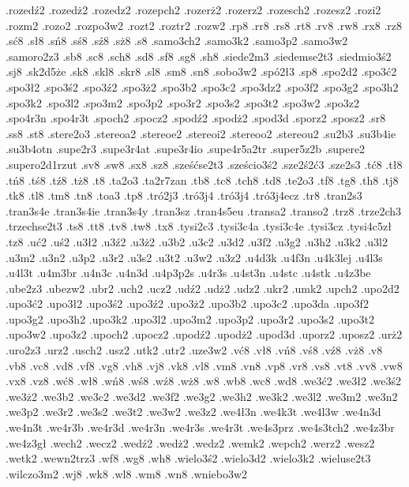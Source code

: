 {.rozed\'z2
.rozed\.z2
.rozedz2
.rozepch2
.rozer\.z2
.rozerz2
.rozesch2
.rozesz2
.rozi2
.rozm2
.rozo2
.rozpo3w2
.rozt2
.roztr2
.rozw2
.rp8
.rr8
.rs8
.rt8
.rv8
.rw8
.rx8
.rz8
.s\'c8
.s\l 8
.s\'n8
.s\'s8
.s\'z8
.s\.z8
.s8
.samo3ch2
.samo3k2
.samo3p2
.samo3w2
.samoro2z3
.sb8
.sc8
.sch8
.sd8
.sf8
.sg8
.sh8
.siede2m3
.siedemse2t3
.siedmio3\'s2
.sj8
.sk\ka2d5\.ze
.sk8
.skl8
.skr8
.sl8
.sm8
.sn8
.sobo3w2
.sp\'o2\l 3
.sp8
.spo2d2
.spo3\'c2
.spo3\l 2
.spo3\'s2
.spo3\'z2
.spo3\.z2
.spo3b2
.spo3c2
.spo3dz2
.spo3f2
.spo3g2
.spo3h2
.spo3k2
.spo3l2
.spo3m2
.spo3p2
.spo3r2
.spo3s2
.spo3t2
.spo3w2
.spo3z2
.spo4r3n
.spo4r3t
.spoch2
.spocz2
.spod\'z2
.spod\.z2
.spod3d
.sporz2
.sposz2
.sr8
.ss8
.st8
.stere2o3
.stereoa2
.stereoe2
.stereoi2
.stereoo2
.stereou2
.su2b3
.su3b4ie
.su3b4otn
.supe2r3
.supe3r4at
.supe3r4io
.supe4r5a2tr
.super5z2b
.supere2
.supero2d1rzut
.sv8
.sw8
.sx8
.sz8
.sze\'s\'cse2t3
.sze\'scio3\'s2
.sze2\'s2\'c3
.sze2s3
.t\'c8
.t\l 8
.t\'n8
.t\'s8
.t\'z8
.t\.z8
.t8
.ta2o3
.ta2r7zan
.tb8
.tc8
.tch8
.td8
.te2o3
.tf8
.tg8
.th8
.tj8
.tk8
.tl8
.tm8
.tn8
.toa3
.tp8
.tr\'o2j3
.tr\'o3j4\ka
.tr\'o3j4\ke
.tr\'o3j4ecz
.tr8
.tran2s3
.tran3s4e
.tran3s4ie
.tran3s4y
.tran3sz
.tran4s5eu
.transa2
.transo2
.trz8
.trze2ch3
.trzechse2t3
.ts8
.tt8
.tv8
.tw8
.tx8
.tysi\ka2c3
.tysi\ka3c4a
.tysi\ka3c4e
.tysi\ka3cz
.tysi\ka4c5z\l 
.tz8
.u\'c2
.u\'s2
.u3\l 2
.u3\'z2
.u3\.z2
.u3b2
.u3c2
.u3d2
.u3f2
.u3g2
.u3h2
.u3k2
.u3l2
.u3m2
.u3n2
.u3p2
.u3r2
.u3s2
.u3t2
.u3w2
.u3z2
.u4d3k
.u4f3n
.u4k3lej
.u4l3s
.u4l3t
.u4m3br
.u4n3c
.u4n3d
.u4p3p2s
.u4r3s
.u4st3n
.u4stc
.u4stk
.u4z3be
.ube2z3
.ubezw2
.ubr2
.uch2
.ucz2
.ud\'z2
.ud\.z2
.udz2
.ukr2
.umk2
.upch2
.upo2d2
.upo3\'c2
.upo3\l 2
.upo3\'s2
.upo3\'z2
.upo3\.z2
.upo3b2
.upo3c2
.upo3da
.upo3f2
.upo3g2
.upo3h2
.upo3k2
.upo3l2
.upo3m2
.upo3p2
.upo3r2
.upo3s2
.upo3t2
.upo3w2
.upo3z2
.upoch2
.upocz2
.upod\'z2
.upod\.z2
.upod3d
.uporz2
.uposz2
.ur\.z2
.uro2z3
.urz2
.usch2
.usz2
.utk2
.utr2
.uze3w2
.v\'c8
.v\l 8
.v\'n8
.v\'s8
.v\'z8
.v\.z8
.v8
.vb8
.vc8
.vd8
.vf8
.vg8
.vh8
.vj8
.vk8
.vl8
.vm8
.vn8
.vp8
.vr8
.vs8
.vt8
.vv8
.vw8
.vx8
.vz8
.w\'c8
.w\l 8
.w\'n8
.w\'s8
.w\'z8
.w\.z8
.w8
.wb8
.wc8
.wd8
.we3\'c2
.we3\l 2
.we3\'s2
.we3\.z2
.we3b2
.we3c2
.we3d2
.we3f2
.we3g2
.we3h2
.we3k2
.we3l2
.we3m2
.we3n2
.we3p2
.we3r2
.we3s2
.we3t2
.we3w2
.we3z2
.we4\l 3n
.we4k3t
.we4l3w
.we4n3d
.we4n3t
.we4r3b
.we4r3d
.we4r3n
.we4r3s
.we4r3t
.we4s3prz
.we4s3tch2
.we4z3br
.we4z3g\l 
.wech2
.wecz2
.wed\'z2
.wed\.z2
.wedz2
.wemk2
.wepch2
.werz2
.wesz2
.wetk2
.wewn\ka2trz3
.wf8
.wg8
.wh8
.wielo3\'s2
.wielo3d2
.wielo3k2
.wieluse2t3
.wilczo3m2
.wj8
.wk8
.wl8
.wm8
.wn8
.wniebo3w2
}
